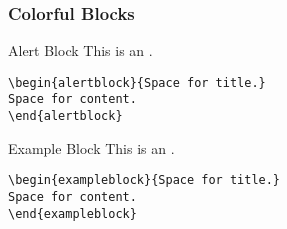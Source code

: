 \documentclass[utf8,aspectratio=169,ngerman,english]{beamer}
\begin{document}
\begin{frame}[containsverbatim]
\frametitle{Colorful Blocks}

\begin{alertblock}{Alert Block}
This is an .
\end{alertblock}
\vspace*{-.25ex}
\begin{lstlisting}[language={[LaTeX]TeX},numbers=none]
\begin{alertblock}{Space for title.}
Space for content.
\end{alertblock} 
\end{lstlisting}

\begin{exampleblock}{Example Block}
This is an .
\end{exampleblock}
\vspace*{-.25ex}
\begin{lstlisting}[language={[LaTeX]TeX},numbers=none]
\begin{exampleblock}{Space for title.}
Space for content.
\end{exampleblock} 
\end{lstlisting}
\end{frame}
\end{document}
